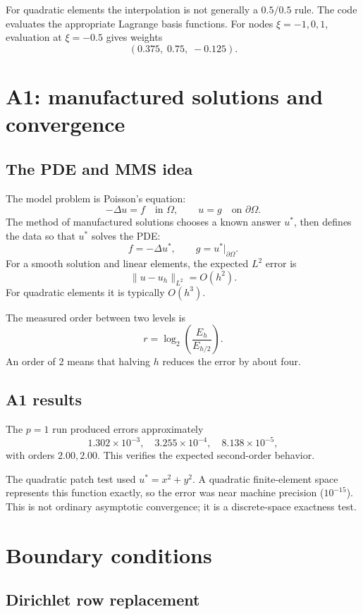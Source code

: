 \documentclass[11pt]{article}
\begin{document}
For quadratic elements the interpolation is not generally a $0.5/0.5$ rule.
The code evaluates the appropriate Lagrange basis functions. For nodes
$\xi=-1,0,1$, evaluation at $\xi=-0.5$ gives weights
\[
 (0.375,\;0.75,\;-0.125).
\]

\section{A1: manufactured solutions and convergence}

\subsection{The PDE and MMS idea}

The model problem is Poisson's equation:
\[
 -\Delta u=f \quad \text{in }\Omega,
 \qquad u=g \quad \text{on }\partial\Omega.
\]
The method of manufactured solutions chooses a known answer $u^*$, then
defines the data so that $u^*$ solves the PDE:
\[
 f=-\Delta u^*, \qquad g=u^*|_{\partial\Omega}.
\]
For a smooth solution and linear elements, the expected $L^2$ error is
\[
 \|u-u_h\|_{L^2}=O(h^2).
\]
For quadratic elements it is typically $O(h^3)$.

The measured order between two levels is
\[
 r=\log_2\left(\frac{E_h}{E_{h/2}}\right).
\]
An order of 2 means that halving $h$ reduces the error by about four.

\subsection{A1 results}

The $p=1$ run produced errors approximately
\[
 1.302\times10^{-3},\quad 3.255\times10^{-4},\quad
 8.138\times10^{-5},
\]
with orders $2.00,2.00$. This verifies the expected second-order behavior.

The quadratic patch test used $u^*=x^2+y^2$. A quadratic finite-element
space represents this function exactly, so the error was near machine
precision ($10^{-15}$). This is not ordinary asymptotic convergence; it is a
discrete-space exactness test.

\section{Boundary conditions}

\subsection{Dirichlet row replacement}
\end{document}
